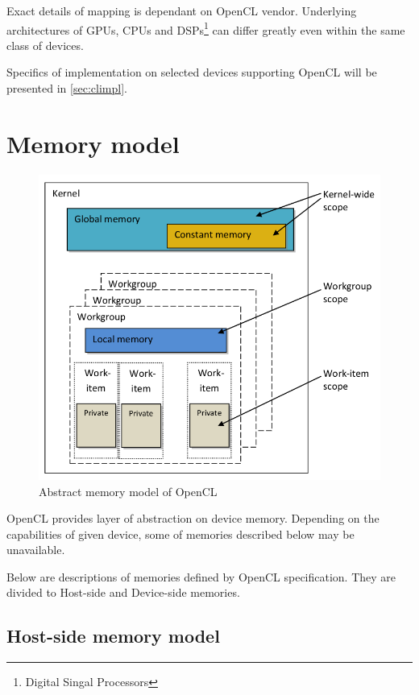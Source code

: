 Exact details of mapping is dependant on OpenCL vendor. Underlying architectures
of GPUs, CPUs and DSPs\footnote{Digital Singal Processors} can differ greatly
even within the same class of devices.

Specifics of implementation on selected devices supporting OpenCL will be
presented in \autoref{sec:climpl}.

\section{Memory model}

\begin{figure}[htpb]
  \begin{center}
    \includegraphics[width=\textwidth]{chapters/opencl/memory.png}
  \end{center}
  \caption{Abstract memory model of OpenCL \parencite{gaster2012heterogeneous}}
  \label{fig:clmemmodel}
\end{figure}

OpenCL provides layer of abstraction on device memory. Depending on the
capabilities of given device, some of memories described below may be
unavailable.

Below are descriptions of memories defined by OpenCL specification. They are
divided to Host-side and Device-side memories.

\subsection{Host-side memory model}

